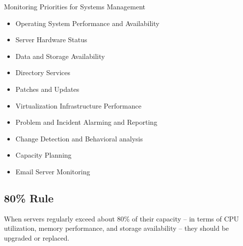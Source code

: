 \documentclass[8pt,a4]{extarticle}
\begin{document}
\begin{multicols}{3}
Monitoring Priorities for Systems Management
\begin{itemize}
    \item Operating System Performance and Availability
    \item Server Hardware Status
    \item Data and Storage Availability
    \item Directory Services
    \item Patches and Updates
    \item Virtualization Infrastructure Performance
    \item Problem and Incident Alarming and Reporting
    \item Change Detection and Behavioral analysis
    \item Capacity Planning
    \item Email Server Monitoring
\end{itemize}

\subsection{80\% Rule}
When servers regularly exceed about 80\% of their capacity – in terms of CPU utilization, memory performance, 
and storage availability – they should be upgraded or replaced. 


\end{multicols}
\end{document}
